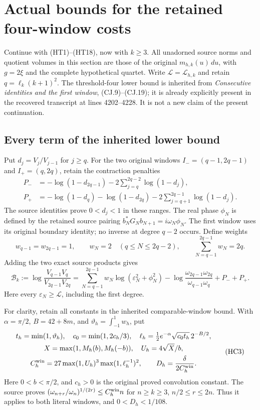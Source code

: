 \section{Actual bounds for the retained four-window costs}

Continue with (HT1)--(HT18), now with $k\geq3$.  All unadorned
source norms and quotient volumes in this section are those of the original
$m_{h,k}(u)\,du$, with $g=2\xi$ and the complete hypothetical quartet.
Write $\mathcal L=\mathcal L_{h,k}$ and retain $q=\ell_k(k+1)^2$.
The threshold-four lower bound is inherited from
\emph{Consecutive identities and the first window}, (CJ.9)--(CJ.19);
it is already explicitly present in the recovered transcript at lines
4202--4228.  It is not a new claim of the present continuation.

\subsection{Every term of the inherited lower bound}

Put $d_j=V_j/V_{j-1}$ for $j\geq q$.  For the two original windows
$I_-=(q-1,2q-1)$ and $I_+=(q,2q)$, retain the contraction penalties
\[
 \begin{split}
 P_-&=-\log(1-d_{2q-1})-2\sum_{j=q}^{2q-2}\log(1-d_j),\\
 P_+&=-\log(1-d_q)-\log(1-d_{2q})
       -2\sum_{j=q+1}^{2q-1}\log(1-d_j).
 \end{split}\tag{HC1}
\]
The source identities prove $0<d_j<1$ in these ranges.  The real phase
$\phi_N$ is defined by the retained source pairing
$b_N^*G_Nb_{N+1}=i\omega_N\phi_N$.  The first window uses its original
boundary identity; no inverse at degree $q-2$ occurs.  Define weights
\[
 w_{q-1}=w_{2q-1}=1,\qquad w_N=2\quad(q\leq N\leq2q-2),
 \qquad\sum_{N=q-1}^{2q-1}w_N=2q.
\]
Adding the two exact source products gives
\[
 \mathcal B_k:=\log\frac{V_{q-1}V_q}{V_{2q-1}V_{2q}}
 =\sum_{N=q-1}^{2q-1}w_N\log(\varepsilon_N^2+\phi_N^2)
 -\log\frac{\omega_{2q-1}\omega_{2q}}{\omega_{q-1}\omega_q}
 +P_-+P_+.
 \tag{HC2}
\]
Here every $\varepsilon_N\geq\mathcal L$, including the first degree.

For clarity, retain all constants in the inherited comparable-window
bound.  With $\alpha=\pi/2$, $B=42+8m$, and
$\vartheta_h=\int_{-1}^{1}w_h$, put
\[
 \begin{gathered}
 t_h=\min(1,\vartheta_h),\quad c_0=\min(1,2c_h/3),\quad
 \ell_h=\tfrac12 e^{-\alpha}\sqrt{c_0t_h}\,2^{-B/2},\\
 X=\max(1,M_h(b),M_h(-b)),\quad U_h=4\sqrt X/b,\\
 C_h^{\rm win}=27\max(1,U_h)^3\max(1,\ell_h^{-1})^2,
 \qquad D_h=\frac{\delta}{2C_h^{\rm win}}.
 \end{gathered}\tag{HC3}
\]
Here $0<b<\pi/2$, and $c_h>0$ is the original proved convolution
constant.  The source proves
$(\omega_{n+r}/\omega_n)^{1/(2r)}\leq C_h^{\rm win}n$ for
$n\geq k\geq3$, $n/2\leq r\leq2n$.  Thus it applies to both literal
windows, and $0<D_h<1/108$.

